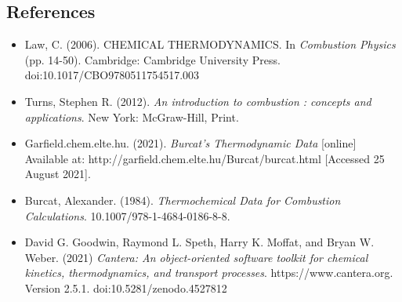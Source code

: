 \documentclass[a4paper,fleqn]{article}
\begin{document}
	\subsection*{References}
	\begin{itemize}
	\item[] Law, C. (2006). CHEMICAL THERMODYNAMICS. In \textit{Combustion Physics} (pp. 14-50). Cambridge: Cambridge University Press. doi:10.1017/CBO9780511754517.003
	\item[] Turns, Stephen R. (2012). \textit{An introduction to combustion : concepts and applications}. New York: McGraw-Hill, Print.
	\item[] Garfield.chem.elte.hu. (2021). \textit{Burcat's Thermodynamic Data} [online] \\Available at: http://garfield.chem.elte.hu/Burcat/burcat.html [Accessed 25 August 2021].
	\item[] Burcat, Alexander. (1984). \textit{Thermochemical Data for Combustion Calculations}. 10.1007/978-1-4684-0186-8-8.
	\item[] David G. Goodwin, Raymond L. Speth, Harry K. Moffat, and Bryan W. Weber. (2021) \textit{Cantera: An object-oriented software toolkit for chemical kinetics, thermodynamics, and transport processes}.
	 https://www.cantera.org. Version 2.5.1. doi:10.5281/zenodo.4527812
	\end{itemize}
\end{document}
